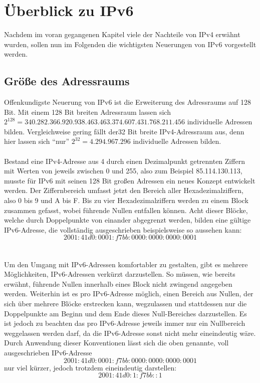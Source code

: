 \documentclass[a4paper,12pt]{scrartcl}
\begin{document}
\clearpage
\section{\"Uberblick zu IPv6}
Nachdem im voran gegangenen Kapitel viele der Nachteile von IPv4 erwähnt wurden, sollen nun im Folgenden die wichtigsten Neuerungen von IPv6 vorgestellt werden. 

\subsection{Gr\"o{\ss}e  des Adressraums}

Offenkundigste Neuerung von IPv6 ist die Erweiterung des Adressraums auf 128 Bit. Mit einem 128 Bit breiten Adressraum lassen sich \\
$2^{128} = 340.282.366.920.938.463.463.374.607.431.768.211.456$ individuelle Adressen bilden. Vergleichweise gering fällt der32 Bit breite IPv4-Adressraum aus, denn hier lassen sich "`nur"' $2^{32} = 4.294.967.296$ individuelle Adressen bilden. \\
\\
Bestand eine IPv4-Adresse aus 4 durch einen Dezimalpunkt getrennten Ziffern mit Werten von jeweils zwischen 0 und 255, also zum Beispiel 85.114.130.113, musste für IPv6 mit seinen 128 Bit großen Adressen ein neues Konzept entwickelt werden.
Der Ziffernbereich umfasst jetzt den Bereich aller Hexadezimalziffern, also 0 bis 9 und A bis F. Bis zu vier Hexadezimalziffern werden zu einem Block zusammen gefasst, wobei führende Nullen entfallen können. Acht dieser Blöcke, welche durch Doppelpunkte von einander abgegrenzt werden, bilden eine gültige IPv6-Adresse, die vollständig ausgeschrieben  beispielsweise so aussehen kann:  \[ 2001:41d0:0001:f7bb:0000:0000:0000:0001 \]\\
\\
Um den Umgang mit IPv6-Adressen komfortabler zu gestalten, gibt es mehrere Möglichkeiten, IPv6-Adressen verkürzt darzustellen. So müssen, wie bereits erwähnt, führende Nullen innerhalb eines Block nicht zwingend angegeben werden. Weiterhin ist es pro IPv6-Adresse möglich, einen Bereich aus Nullen, der sich über mehrere Blöcke erstrecken kann, wegzulassen und stattdessen nur die Doppelpunkte am Beginn und dem Ende dieses Null-Bereiches darzustellen. Es ist jedoch zu beachten das pro IPv6-Adresse jeweils immer nur ein Nullbereich weggelassen werden darf, da die IPv6-Adresse sonst nicht mehr eineindeutig wäre. Durch Anwendung dieser Konventionen lässt sich die oben genannte, voll ausgeschrieben IPv6-Adresse
\[ 2001:41d0:0001:f7bb:0000:0000:0000:0001 \]
nur viel kürzer, jedoch trotzdem eineindeutig darstellen:
 \[ 2001:41d0:1:f7bb::1 \]
 
\end{document}

